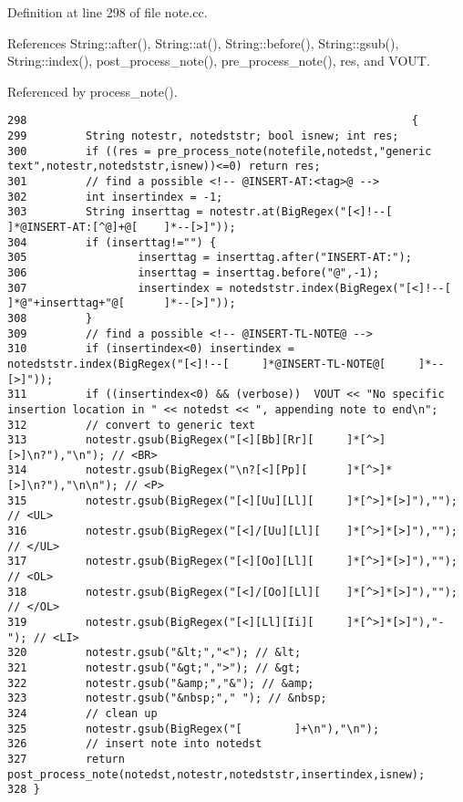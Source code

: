 Definition at line 298 of file note.cc.

References String::after(), String::at(), String::before(), String::gsub(), String::index(), post\_\-process\_\-note(), pre\_\-process\_\-note(), res, and VOUT.

Referenced by process\_\-note().



\footnotesize\begin{verbatim}298                                                           {
299         String notestr, notedststr; bool isnew; int res;
300         if ((res = pre_process_note(notefile,notedst,"generic text",notestr,notedststr,isnew))<=0) return res;
301         // find a possible <!-- @INSERT-AT:<tag>@ -->
302         int insertindex = -1;
303         String inserttag = notestr.at(BigRegex("[<]!--[         ]*@INSERT-AT:[^@]+@[    ]*--[>]"));
304         if (inserttag!="") {
305                 inserttag = inserttag.after("INSERT-AT:");
306                 inserttag = inserttag.before("@",-1);
307                 insertindex = notedststr.index(BigRegex("[<]!--[        ]*@"+inserttag+"@[      ]*--[>]"));
308         }
309         // find a possible <!-- @INSERT-TL-NOTE@ -->
310         if (insertindex<0) insertindex = notedststr.index(BigRegex("[<]!--[     ]*@INSERT-TL-NOTE@[     ]*--[>]"));
311         if ((insertindex<0) && (verbose))  VOUT << "No specific insertion location in " << notedst << ", appending note to end\n";
312         // convert to generic text
313         notestr.gsub(BigRegex("[<][Bb][Rr][     ]*[^>][>]\n?"),"\n"); // <BR>
314         notestr.gsub(BigRegex("\n?[<][Pp][      ]*[^>]*[>]\n?"),"\n\n"); // <P>
315         notestr.gsub(BigRegex("[<][Uu][Ll][     ]*[^>]*[>]"),""); // <UL>
316         notestr.gsub(BigRegex("[<]/[Uu][Ll][    ]*[^>]*[>]"),""); // </UL>
317         notestr.gsub(BigRegex("[<][Oo][Ll][     ]*[^>]*[>]"),""); // <OL>
318         notestr.gsub(BigRegex("[<]/[Oo][Ll][    ]*[^>]*[>]"),""); // </OL>
319         notestr.gsub(BigRegex("[<][Ll][Ii][     ]*[^>]*[>]"),"- "); // <LI>
320         notestr.gsub("&lt;","<"); // &lt;
321         notestr.gsub("&gt;",">"); // &gt;
322         notestr.gsub("&amp;","&"); // &amp;
323         notestr.gsub("&nbsp;"," "); // &nbsp;
324         // clean up
325         notestr.gsub(BigRegex("[        ]+\n"),"\n");
326         // insert note into notedst
327         return post_process_note(notedst,notestr,notedststr,insertindex,isnew);
328 }
\end{verbatim}\normalsize 
{}
